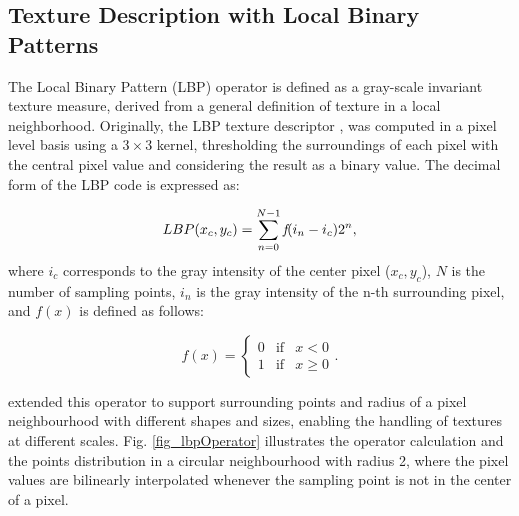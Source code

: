 \begin{appendices}
\chapter{Texture Description with Local Binary Patterns}
\label{AppendixA}

The Local Binary Pattern (LBP) operator is defined as a gray-scale invariant texture measure, derived from a general definition of texture in a local neighborhood. Originally, the LBP texture descriptor \cite{ojala1996comparative}, was computed in a pixel level basis using a $3 \times 3$ kernel, thresholding the surroundings of each pixel with the central pixel value and considering the result as a binary value. The decimal form of the LBP code is expressed as:

\begin{equation}
LBP(x_{c},y_{c})=\displaystyle\sum\limits_{n=0}^{N-1} \emph{f}(i_{n}-i_{c})2^n,
\label{eq:LBP}
\end{equation}
\noindent where $i_{c}$ corresponds to the gray intensity of the center pixel ($x_{c}, y_{c}$), $N$ is the number of sampling points, $i_{n}$ is the gray intensity of the n-th surrounding pixel, and $f(x)$ is defined as follows:

\begin{equation}
f(x)  =
\left\lbrace \begin{array}{ccc}
0 & \mbox{if} & x<0 \\
1 & \mbox{if} & x\geq0 
\end{array}. \right.
\label{eq:fx}
\end{equation}

\cite{ojala2002multiresolution} extended this operator to support surrounding points and radius of a pixel neighbourhood with different shapes and sizes, enabling the handling of textures at different scales. Fig. \ref{fig_lbpOperator} illustrates the operator calculation and the points distribution in a circular neighbourhood with radius 2, where the pixel values are bilinearly interpolated whenever the sampling point is not in the center of a pixel.


\end{appendices}
